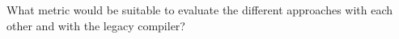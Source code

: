 
What metric would be suitable to evaluate the different approaches with each other and with the legacy compiler?

